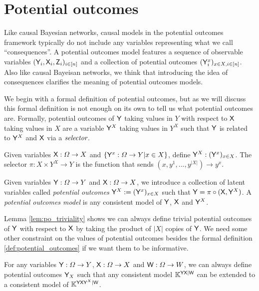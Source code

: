 

\section{Potential outcomes}\label{sec:potential_outcomes}

Like causal Bayesian networks, causal models in the potential outcomes framework typically do not include any variables representing what we call ``consequences''. A potential outcomes model features a sequence of observable variables $(\mathsf{Y}_i,\mathsf{X}_i,\mathsf{Z}_i)_{i\in [n]}$ and a collection of potential outcomes $(\mathsf{Y}^x_i)_{x\in X, i\in[n]}$. Also like causal Bayeisan networks, we think that introducing the idea of consequences clarifies the meaning of potential outcomes models.

We begin with a formal definition of potential outcomes, but as we will discuss this formal definition is not enough on its own to tell us what potential outcomes are. Formally, potential outcomes of $\mathsf{Y}$ taking values in $Y$ with respect to $\mathsf{X}$ taking values in $X$ are a variable $\mathsf{Y}^X$ taking values in $Y^X$ such that $\mathsf{Y}$ is related to $\mathsf{Y}^X$ and $\mathsf{X}$ via a $\emph{selector}$.

\begin{definition}[Selector]
Given variables $\mathsf{X}:\Omega\to X$ and $\{\mathsf{Y}^x:\Omega\to Y|x\in X\}$, define $\mathsf{Y}^X:(\mathsf{Y}^x)_{x\in X}$. The selector $\pi:X\times Y^X\to Y$ is the function that sends $(x,y^1,...,y^{|X|})\to y^x$.
\end{definition}

\begin{definition}\label{def:potential_outcomes}
Given variables $\mathsf{Y}:\Omega\to Y$ and $\mathsf{X}:\Omega\to X$, we introduce a collection of latent variables called \emph{potential outcomes} $\mathsf{Y}^X:=(\mathsf{Y}^x)_{x\in X}$ such that $\mathsf{Y} = \pi\circ(\mathsf{X},\mathsf{Y}^X)$. A \emph{potential outcomes model} is any consistent model of $\mathsf{Y}$, $\mathsf{X}$ and $\mathsf{Y}^X$.
\end{definition}

Lemma \ref{lem:po_triviality} shows we can always define trivial potential outcomes of $\mathsf{Y}$ with respect to $\mathsf{X}$ by taking the product of $|X|$ copies of $\mathsf{Y}$. We need some other constraint on the values of potential outcomes besides the formal definition \ref{def:potential_outcomes} if we want them to be informative.

\begin{lemma}\label{lem:po_triviality}
For any variables $\mathsf{Y}:\Omega\to Y$, $\mathsf{X}:\Omega\to X$ and $\mathsf{W}:\Omega\to W$, we can always define potential outcomes $\mathsf{Y}_X$ such that any consistent model $\mathbb{K}^{\mathsf{YX}|\mathsf{W}}$ can be extended to a consistent model of $\mathbb{K}^{\mathsf{YXY}^X|\mathsf{W}}$.
\end{lemma}

